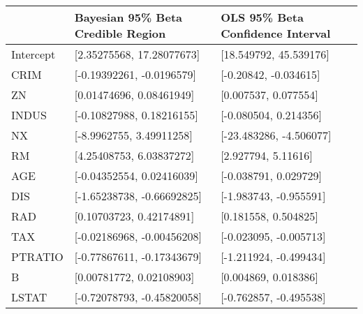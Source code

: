 \begin{tabular}{lll}
\hline
           & Bayesian 95\% Beta Credible Region   & OLS 95\% Beta Confidence Interval   \\
\hline
 Intercept & [2.35275568, 17.28077673]           & [18.549792, 45.539176]             \\
 CRIM      & [-0.19392261, -0.0196579]           & [-0.20842, -0.034615]              \\
 ZN        & [0.01474696, 0.08461949]            & [0.007537, 0.077554]               \\
 INDUS     & [-0.10827988, 0.18216155]           & [-0.080504, 0.214356]              \\
 NX        & [-8.9962755, 3.49911258]            & [-23.483286, -4.506077]            \\
 RM        & [4.25408753, 6.03837272]            & [2.927794, 5.11616]                \\
 AGE       & [-0.04352554, 0.02416039]           & [-0.038791, 0.029729]              \\
 DIS       & [-1.65238738, -0.66692825]          & [-1.983743, -0.955591]             \\
 RAD       & [0.10703723, 0.42174891]            & [0.181558, 0.504825]               \\
 TAX       & [-0.02186968, -0.00456208]          & [-0.023095, -0.005713]             \\
 PTRATIO   & [-0.77867611, -0.17343679]          & [-1.211924, -0.499434]             \\
 B         & [0.00781772, 0.02108903]            & [0.004869, 0.018386]               \\
 LSTAT     & [-0.72078793, -0.45820058]          & [-0.762857, -0.495538]             \\
\hline
\end{tabular}